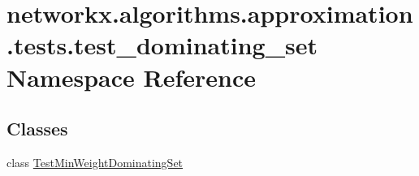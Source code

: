 \hypertarget{namespacenetworkx_1_1algorithms_1_1approximation_1_1tests_1_1test__dominating__set}{}\section{networkx.\+algorithms.\+approximation.\+tests.\+test\+\_\+dominating\+\_\+set Namespace Reference}
\label{namespacenetworkx_1_1algorithms_1_1approximation_1_1tests_1_1test__dominating__set}
\subsection*{Classes}
\begin{DoxyCompactItemize}
\item 
class \hyperlink{classnetworkx_1_1algorithms_1_1approximation_1_1tests_1_1test__dominating__set_1_1TestMinWeightDominatingSet}{Test\+Min\+Weight\+Dominating\+Set}
\end{DoxyCompactItemize}
